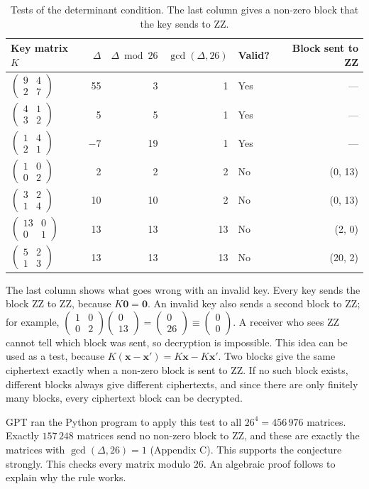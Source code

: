 \documentclass[11pt,a4paper]{article}
\newcommand{\smat}[1]{\left(\begin{smallmatrix}#1\end{smallmatrix}\right)}
\newcommand{\x}{\mathbf{x}}   %
\theoremstyle{plain}
\theoremstyle{definition}
\begin{document}
\begin{table}[ht]
\centering
\small
\caption{Tests of the determinant condition. The last column gives a non-zero block that the key sends to ZZ.}
\label{tab:keys}
\setlength{\tabcolsep}{7pt}
\begin{tabular}{l r r r l r}
\toprule
Key matrix $K$ & $\Delta$ & $\Delta\bmod26$ & $\gcd(\Delta,26)$ & Valid? & Block sent to ZZ\\
\midrule
$\smat{9&4\\2&7}$  & 55 & 3  & 1  & Yes & ---\\
$\smat{4&1\\3&2}$  & 5  & 5  & 1  & Yes & ---\\
$\smat{1&4\\2&1}$  & $-7$ & 19 & 1 & Yes & ---\\
$\smat{1&0\\0&2}$  & 2  & 2  & 2  & No  & (0, 13)\\
$\smat{3&2\\1&4}$  & 10 & 10 & 2  & No  & (0, 13)\\
$\smat{13&0\\0&1}$ & 13 & 13 & 13 & No  & (2, 0)\\
$\smat{5&2\\1&3}$  & 13 & 13 & 13 & No  & (20, 2)\\
\bottomrule
\end{tabular}
\end{table}

The last column shows what goes wrong with an invalid key. Every key sends the block ZZ to ZZ, because $K\mathbf{0}=\mathbf{0}$. An invalid key also sends a second block to ZZ; for example, $\smat{1&0\\0&2}\smat{0\\13}=\smat{0\\26}\equiv\smat{0\\0}$. A receiver who sees ZZ cannot tell which block was sent, so decryption is impossible. This idea can be used as a test, because $K(\x-\x')=K\x-K\x'$. Two blocks give the same ciphertext exactly when a non-zero block is sent to ZZ. If no such block exists, different blocks always give different ciphertexts, and since there are only finitely many blocks, every ciphertext block can be decrypted.

GPT ran the Python program to apply this test to all $26^4=456\,976$ matrices. Exactly $157\,248$ matrices send no non-zero block to ZZ, and these are exactly the matrices with $\gcd(\Delta,26)=1$ (Appendix C). This supports the conjecture strongly. This checks every matrix modulo $26$. An algebraic proof follows to explain why the rule works.
\end{document}
